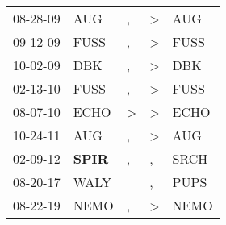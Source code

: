 \begin{supertabular}{p{0.07\textwidth}p{0.06\textwidth}p{0.02\textwidth}p{0.02\textwidth}p{0.06\textwidth}}
 08-28-09\textsuperscript{} &            AUG\textsuperscript{} &             , &  \textgreater &   AUG\textsuperscript{} \\
 09-12-09\textsuperscript{} &           FUSS\textsuperscript{} &             , &  \textgreater &  FUSS\textsuperscript{} \\
 10-02-09\textsuperscript{} &            DBK\textsuperscript{} &             , &  \textgreater &   DBK\textsuperscript{} \\
 02-13-10\textsuperscript{} &           FUSS\textsuperscript{} &             , &  \textgreater &  FUSS\textsuperscript{} \\
 08-07-10\textsuperscript{} &           ECHO\textsuperscript{} &  \textgreater &  \textgreater &  ECHO\textsuperscript{} \\
 10-24-11\textsuperscript{} &            AUG\textsuperscript{} &             , &  \textgreater &   AUG\textsuperscript{} \\
 02-09-12\textsuperscript{} &  \textbf{SPIR\textsuperscript{}} &             , &             , &  SRCH\textsuperscript{} \\
 08-20-17\textsuperscript{} &           WALY\textsuperscript{} &               &             , &  PUPS\textsuperscript{} \\
 08-22-19\textsuperscript{} &           NEMO\textsuperscript{} &             , &  \textgreater &  NEMO\textsuperscript{} \\
\end{supertabular}
